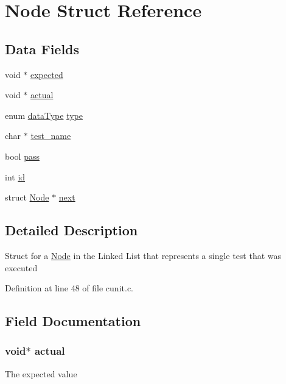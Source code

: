\hypertarget{struct_node}{\section{Node Struct Reference}
\label{struct_node}
}
\subsection*{Data Fields}
\begin{DoxyCompactItemize}
\item 
void $\ast$ \hyperlink{struct_node_a61a9460560c0f02cb4e58157d51db0bf}{expected}
\item 
void $\ast$ \hyperlink{struct_node_a4eff1f1838896a792dae71dcc43ca50c}{actual}
\item 
enum \hyperlink{cunit_8h_a617ddb88ebf58e2f0add63ae88a9f705}{data\-Type} \hyperlink{struct_node_a6e3def444d6680408fd3ce31350d852c}{type}
\item 
char $\ast$ \hyperlink{struct_node_a8b6908a3aa00c76fb4cabc4807a5c572}{test\-\_\-name}
\item 
bool \hyperlink{struct_node_a2d767829f56307840b3cf6e14dd195ff}{pass}
\item 
int \hyperlink{struct_node_a7441ef0865bcb3db9b8064dd7375c1ea}{id}
\item 
struct \hyperlink{struct_node}{Node} $\ast$ \hyperlink{struct_node_aa162dd1e0693188a22b1f13b9a2a0ef0}{next}
\end{DoxyCompactItemize}


\subsection{Detailed Description}
Struct for a \hyperlink{struct_node}{Node} in the Linked List that represents a single test that was executed 

Definition at line 48 of file cunit.\-c.



\subsection{Field Documentation}
\hypertarget{struct_node_a4eff1f1838896a792dae71dcc43ca50c}{
\subsubsection[{actual}]{\setlength{\rightskip}{0pt plus 5cm}void$\ast$ actual}}\label{struct_node_a4eff1f1838896a792dae71dcc43ca50c}
The expected value 

